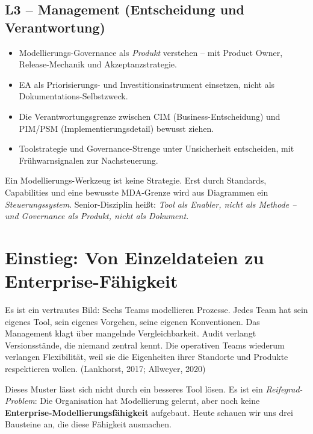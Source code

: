 \documentclass[11pt,a4paper,oneside]{article}
\newcommand{\fachbegriff}[1]{\textbf{#1}}
\newcommand{\quelle}[1]{{\footnotesize\color{lpGray}(#1)}}
\begin{document}
\subsection*{L3 -- Management (Entscheidung und Verantwortung)}
\begin{itemize}
  \item Modellierungs-Governance als \emph{Produkt} verstehen -- mit Product Owner, Release-Mechanik und Akzeptanzstrategie.
  \item EA als Priorisierungs- und Investitions\-instrument einsetzen, nicht als Dokumentations-Selbstzweck.
  \item Die Verantwortungsgrenze zwischen CIM (Business-Entscheidung) und PIM/PSM (Implementierungsdetail) bewusst ziehen.
  \item Toolstrategie und Governance-Strenge unter Unsicherheit entscheiden, mit Frühwarnsignalen zur Nachsteuerung.
\end{itemize}

\begin{merkbox}
Ein Modellierungs-Werkzeug ist keine Strategie. Erst durch Standards, Capabilities und eine bewusste MDA-Grenze wird aus Diagrammen ein \emph{Steuerungssystem}. Senior-Disziplin heißt: \emph{Tool als Enabler, nicht als Methode -- und Governance als Produkt, nicht als Dokument.}
\end{merkbox}

\clearpage

\section{Einstieg: Von Einzeldateien zu Enterprise-Fähigkeit}

Es ist ein vertrautes Bild: Sechs Teams modellieren Prozesse. Jedes Team hat sein eigenes Tool, sein eigenes Vorgehen, seine eigenen Konventionen. Das Management klagt über mangelnde Vergleichbarkeit. Audit verlangt Versionsstände, die niemand zentral kennt. Die operativen Teams wiederum verlangen Flexibilität, weil sie die Eigenheiten ihrer Standorte und Produkte respektieren wollen. \quelle{Lankhorst, 2017; Allweyer, 2020}

Dieses Muster lässt sich nicht durch ein besseres Tool lösen. Es ist ein \emph{Reifegrad-Problem}: Die Organisation hat Modellierung gelernt, aber noch keine \fachbegriff{Enterprise-Modellierungs\-fähigkeit} aufgebaut. Heute schauen wir uns drei Bausteine an, die diese Fähigkeit ausmachen.
\end{document}
